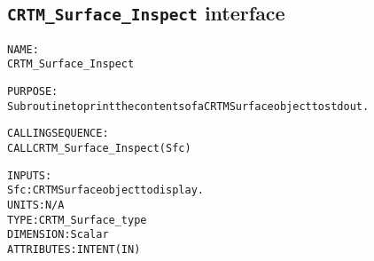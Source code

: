 \subsection{\texttt{CRTM\_Surface\_Inspect} interface}
  \label{sec:CRTM_Surface_Inspect_interface}
  \begin{alltt}
 
  NAME:
        CRTM_Surface_Inspect
 
  PURPOSE:
        Subroutine to print the contents of a CRTM Surface object to stdout.
 
  CALLING SEQUENCE:
        CALL CRTM_Surface_Inspect( Sfc )
 
  INPUTS:
        Sfc:  CRTM Surface object to display.
              UNITS:      N/A
              TYPE:       CRTM_Surface_type
              DIMENSION:  Scalar
              ATTRIBUTES: INTENT(IN)
 
  \end{alltt}
